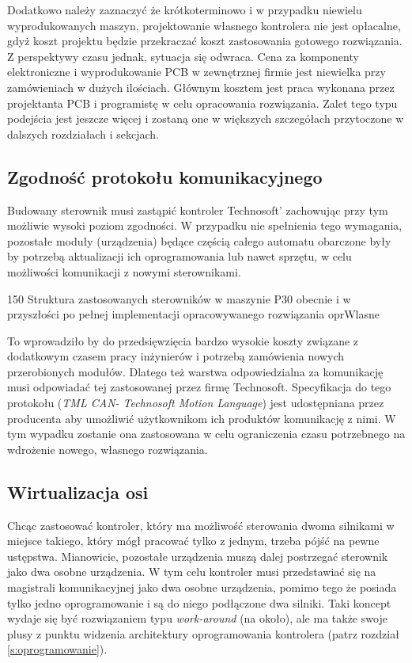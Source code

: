 Dodatkowo należy zaznaczyć że krótkoterminowo i w przypadku niewielu wyprodukowanych maszyn, projektowanie własnego kontrolera nie jest opłacalne, gdyż koszt projektu będzie przekraczać koszt zastosowania gotowego rozwiązania. Z perspektywy czasu jednak, sytuacja się odwraca. Cena za komponenty elektroniczne i wyprodukowanie PCB w zewnętrznej firmie jest niewielka przy zamówieniach w dużych ilościach. Głównym kosztem jest praca wykonana przez projektanta PCB i programistę w celu opracowania rozwiązania. Zalet tego typu podejścia jest jeszcze więcej i zostaną one w większych szczegółach przytoczone w dalszych rozdziałach i sekcjach.

\subsection{Zgodność protokołu komunikacyjnego}

Budowany sterownik musi zastąpić kontroler Technosoft' zachowując przy tym możliwie wysoki poziom zgodności. W przypadku nie spełnienia tego wymagania, pozostałe moduły (urządzenia) będące częścią całego automatu obarczone były by potrzebą aktualizacji ich oprogramowania lub nawet sprzętu, w celu możliwości komunikacji z nowymi sterownikami. 

	{150}
	{Struktura zastosowanych sterowników w maszynie P30 obecnie i w przyszłości po pełnej implementacji opracowywanego rozwiązania}
	{oprWlasne}

To wprowadziło by do przedsięwzięcia bardzo wysokie koszty związane z dodatkowym czasem pracy inżynierów i potrzebą zamówienia nowych przerobionych modułów. Dlatego też warstwa odpowiedzialna za komunikację musi odpowiadać tej zastosowanej przez firmę Technosoft. Specyfikacja do tego protokołu ({\it TML CAN- Technosoft Motion Language}) jest udostępniana przez producenta aby umożliwić użytkownikom ich produktów komunikację z nimi. W tym wypadku zostanie ona zastosowana w celu  ograniczenia czasu potrzebnego na wdrożenie nowego, własnego rozwiązania.

\subsection{Wirtualizacja osi}
\label{ss:axis_virtualisation}

Chcąc zastosować kontroler, który ma możliwość sterowania dwoma silnikami w miejsce takiego, który mógł pracować tylko z jednym, trzeba pójść na pewne ustępstwa. Mianowicie, pozostałe urządzenia muszą dalej postrzegać sterownik jako dwa osobne urządzenia. W tym celu kontroler musi przedstawiać się na magistrali komunikacyjnej jako dwa osobne urządzenia, pomimo tego że posiada tylko jedno oprogramowanie i są do niego podłączone dwa silniki. Taki koncept wydaje się być rozwiązaniem typu {\it work-around} (na około), ale ma także swoje plusy z punktu widzenia architektury oprogramowania kontrolera (patrz rozdział \ref{s:oprogramowanie}). \\

